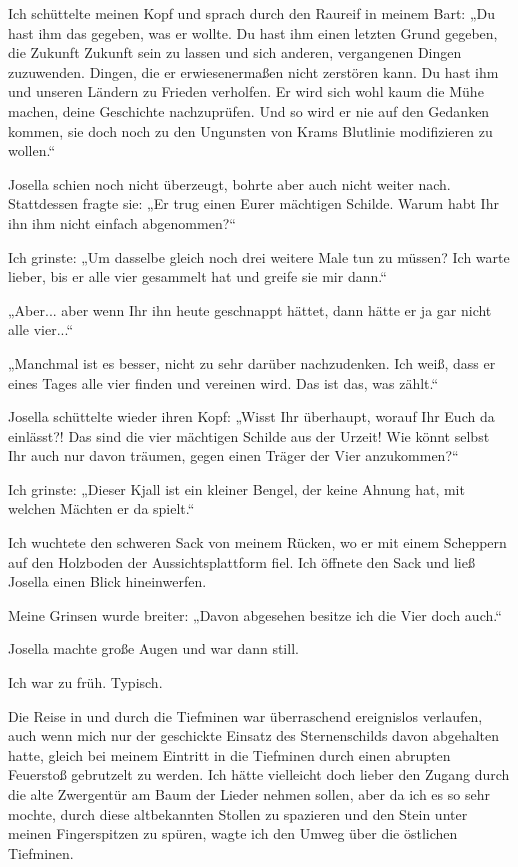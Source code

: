 Ich schüttelte meinen Kopf und sprach durch den Raureif in meinem Bart: „Du hast ihm das gegeben, was er wollte. Du hast ihm einen letzten Grund gegeben, die Zukunft Zukunft sein zu lassen und sich anderen, vergangenen Dingen zuzuwenden. Dingen, die er erwiesenermaßen nicht zerstören kann. Du hast ihm und unseren Ländern zu Frieden verholfen. Er wird sich wohl kaum die Mühe machen, deine Geschichte nachzuprüfen. Und so wird er nie auf den Gedanken kommen, sie doch noch zu den Ungunsten von Krams Blutlinie modifizieren zu wollen.“

Josella schien noch nicht überzeugt, bohrte aber auch nicht weiter nach. Stattdessen fragte sie: „Er trug einen Eurer mächtigen Schilde. Warum habt Ihr ihn ihm nicht einfach abgenommen?“

Ich grinste: „Um dasselbe gleich noch drei weitere Male tun zu müssen? Ich warte lieber, bis er alle vier gesammelt hat und greife sie mir dann.“

„Aber... aber wenn Ihr ihn heute geschnappt hättet, dann hätte er ja gar nicht alle vier...“

„Manchmal ist es besser, nicht zu sehr darüber nachzudenken. Ich weiß, dass er eines Tages alle vier finden und vereinen wird. Das ist das, was zählt.“

Josella schüttelte wieder ihren Kopf: „Wisst Ihr überhaupt, worauf Ihr Euch da einlässt?! Das sind die vier mächtigen Schilde aus der Urzeit! Wie könnt selbst Ihr auch nur davon träumen, gegen einen Träger der Vier anzukommen?“

Ich grinste: „Dieser Kjall ist ein kleiner Bengel, der keine Ahnung hat, mit welchen Mächten er da spielt.“

Ich wuchtete den schweren Sack von meinem Rücken, wo er mit einem Scheppern auf den Holzboden der Aussichtsplattform fiel. Ich öffnete den Sack und ließ Josella einen Blick hineinwerfen.

Meine Grinsen wurde breiter: „Davon abgesehen besitze ich die Vier doch auch.“

Josella machte große Augen und war dann still.


Ich war zu früh. Typisch.

Die Reise in und durch die Tiefminen war überraschend ereignislos verlaufen, auch wenn mich nur der geschickte Einsatz des Sternenschilds davon abgehalten hatte, gleich bei meinem Eintritt in die Tiefminen durch einen abrupten Feuerstoß gebrutzelt zu werden. Ich hätte vielleicht doch lieber den Zugang durch die alte Zwergentür am Baum der Lieder nehmen sollen, aber da ich es so sehr mochte, durch diese altbekannten Stollen zu spazieren und den Stein unter meinen Fingerspitzen zu spüren, wagte ich den Umweg über die östlichen Tiefminen.

